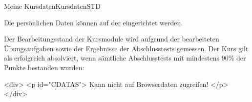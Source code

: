 \begin{MXContent}{Meine Kursdaten}{Kursdaten}{STD}
\MGlobalDataTag
{}

Die persönlichen Daten können auf der  eingerichtet werden.

Der Bearbeitungsstand der Kursmodule wird aufgrund der bearbeiteten Übungsaufgaben sowie der Ergebnisse
der Abschlusstests gemessen. Der Kurs gilt als erfolgreich absolviert, wenn sämtliche Abschlusstests mit mindestens 90\% der Punkte bestanden wurden:

\begin{html}
<div>
<p id="CDATAS">
Kann nicht auf Browserdaten zugreifen!
</p>
</div>
\end{html}


\end{MXContent}



